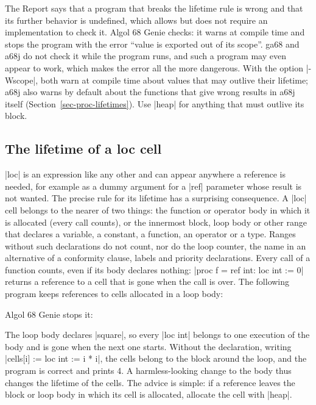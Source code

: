 \begin{implnote}
The Report says that a program that breaks the lifetime rule is wrong and
that its further behavior is undefined, which allows but does not
require an implementation to check it. Algol 68 Genie checks: it warns at
compile time and stops the program with the error ``value is exported out
of its scope''. ga68 and a68j do not check it while the program runs,
and such a program may even appear to work, which makes the error all
the more dangerous. With the option \code|-Wscope|, both warn at compile
time about values that may outlive their lifetime; a68j also warns by
default about the functions that give wrong results in a68j itself
(Section~\ref{sec-proc-lifetimes}). Use \code|heap| for anything that
must outlive its block.
\end{implnote}

\subsection*{The lifetime of a \textbf{loc} cell}

\code|loc| is an expression like any other and can appear anywhere a
reference is needed, for example as a dummy argument for a
\code|ref| parameter whose result is not wanted. The precise rule for its
lifetime has a surprising consequence. A \code|loc| cell belongs to the
nearer of two things: the function or operator body in which it is
allocated (every call counts), or the innermost block, loop body or
other range that declares a variable, a constant, a function, an
operator or a type. Ranges without such
declarations do not count, nor do the loop counter, the name in an
alternative of a conformity clause, labels and priority declarations. Every call of
a function counts, even if its body declares nothing:
\code|proc f = ref int: loc int := 0| returns a reference to a cell that
is gone when the call is over. The following program keeps references to cells allocated in
a loop body:


\noindent Algol 68 Genie stops it:

The loop body declares \code|square|, so every \code|loc int| belongs to
one execution of the body and is gone when the next one starts. Without
the declaration, writing \code|cells[i] := loc int := i * i|, the cells
belong to the block around the loop, and the program is correct and
prints 4. A harmless-looking change to the body thus changes the
lifetime of the cells. The advice is simple: if a reference leaves the
block or loop body in which its cell is allocated, allocate the cell with
\code|heap|.

